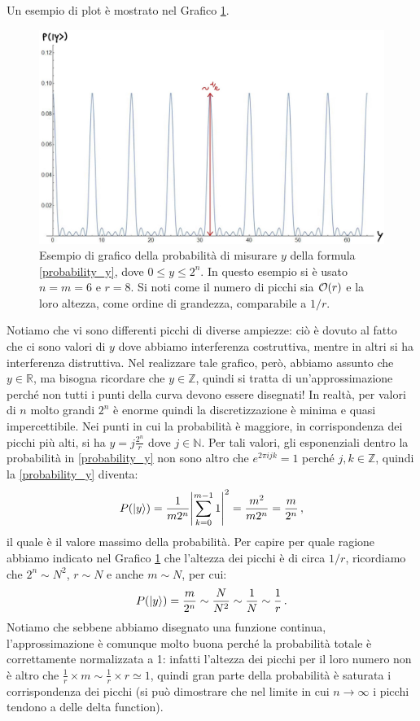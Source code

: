 \noindent Un esempio di plot è mostrato nel Grafico \ref{fig:probability_y}. 
\begin{figure}[!ht]
    \centering
    \includegraphics[scale=0.325]{images/probability_y}
    \caption{Esempio di grafico della probabilità di misurare $y$ della formula \eqref{probability_y}, dove $0 \leq y \leq 2^n$. In questo esempio si è usato $n = m = 6$ e $r = 8$. Si noti come il numero di picchi sia $\order{r}$ e la loro altezza, come ordine di grandezza, comparabile a $1/r$.}
    \label{fig:probability_y}
\end{figure}
Notiamo che vi sono differenti picchi di diverse ampiezze: ciò è dovuto al fatto che ci sono valori di $y$ dove abbiamo interferenza costruttiva, mentre in altri si ha interferenza distruttiva. Nel realizzare tale grafico, però, abbiamo assunto che $y \in \mathbb{R}$, ma bisogna ricordare che $y\in \mathbb{Z}$, quindi si tratta di un'approssimazione perché non tutti i punti della curva devono essere disegnati! In realtà, per valori di $n$ molto grandi $2^n$ è enorme quindi la discretizzazione è minima e quasi impercettibile. Nei punti in cui la probabilità è maggiore, in corrispondenza dei picchi più alti, si ha $y = j\frac{2^n}{r}$ dove $j \in \mathbb{N}$. Per tali valori, gli esponenziali dentro la probabilità in \eqref{probability_y} non sono altro che $e^{2\pi i j k}=1$ perché $j, k \in \mathbb{Z}$, quindi la \eqref{probability_y} diventa:
\begin{equation*}
    P(\ket{y}) = \frac{1}{m 2^n} \abs{\sum_{k=0}^{m-1} 1}^2 = \frac{m^2}{m2^n} = \frac{m}{2^n} \, ,
\end{equation*}
il quale è il valore massimo della probabilità. Per capire per quale ragione abbiamo indicato nel Grafico \ref{fig:probability_y} che l'altezza dei picchi è di circa $1/r$, ricordiamo che $2^n \sim N^2$, $r \sim N$ e anche $m \sim N$, per cui:
\begin{equation*}
    P(\ket{y}) = \frac{m}{2^n} \sim \frac N{N^2} \sim \frac 1 N \sim \frac 1 r \, .
\end{equation*}
Notiamo che sebbene abbiamo disegnato una funzione continua, l'approssimazione è comunque molto buona perché la probabilità totale è correttamente normalizzata a 1: infatti l'altezza dei picchi per il loro numero non è altro che $\frac{1}{r} \times m \sim \frac{1}{r} \times r \simeq 1$, quindi gran parte della probabilità è saturata i corrispondenza dei picchi (si può dimostrare che nel limite in cui $n \to \infty$ i picchi tendono a delle delta function). 

